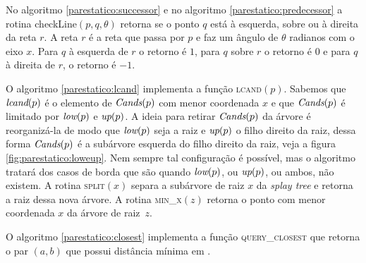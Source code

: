 No algoritmo \ref{parestatico:successor} e no algoritmo
\ref{parestatico:predecessor} a rotina checkLine$(p, q, \theta)$ retorna se o ponto
$q$ está à esquerda, sobre ou à direita da reta $r$. A reta $r$ é a reta que
passa por $p$ e faz um ângulo de $\theta$ radianos com o eixo $x$. Para $q$
à esquerda de $r$ o retorno é $1$, para $q$ sobre $r$ o retorno é $0$ e para
$q$ à direita de $r$, o retorno é $-1$.

O algoritmo \ref{parestatico:lcand} implementa a função
\textsc{lcand}$(p)$. Sabemos que $\textit{lcand}(p)$ é o elemento de
$\textit{Cands}(p)$ com menor coordenada $x$ e que $\textit{Cands}(p)$ é limitado
por $\textit{low}(p)$ e $\textit{up}(p)$. A ideia para retirar $\textit{Cands}(p)$ da árvore
é reorganizá-la de modo que $\textit{low}(p)$ seja a raiz e $\textit{up}(p)$ o filho
direito da raiz, dessa forma $\textit{Cands}(p)$ é a subárvore esquerda do
filho direito da raiz, veja a figura \ref{fig:parestatico:loweup}.
Nem sempre tal configuração é possível, mas o algoritmo tratará dos
casos de borda que são quando $\textit{low}(p)$, ou $\textit{up}(p)$, ou ambos, não
existem. A rotina \textsc{split}$(x)$ separa a subárvore de raiz $x$
da \textit{splay tree} e retorna a raiz dessa nova árvore. A rotina
\textsc{min\_x}$(z)$ retorna o ponto com menor coordenada $x$ da
árvore de raiz~$z$.









O algoritmo \ref{parestatico:closest} implementa a função
\textsc{query\_closest} que retorna o par $(a,b)$ que possui
distância mínima em \pontos.


